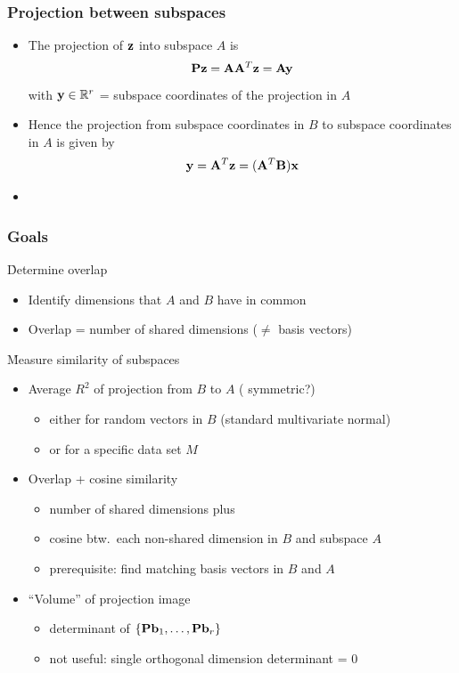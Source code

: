 \documentclass[t]{beamer} %
\begin{document}
\begin{frame}
  \frametitle{Projection between subspaces}

  \begin{itemize}
  \item The projection of $\vz$ into subspace $A$ is
    \[
      \mathbf{P} \vz = \mathbf{A} \mathbf{A}^T \vz = \mathbf{A} \vy
    \]
    with $\vy\in \setR^r$ = subspace coordinates of the projection in $A$
  \item Hence the projection from subspace coordinates in $B$ to subspace coordinates in $A$ is given by
    \[
      \vy = \mathbf{A}^T \vz = (\mathbf{A}^T \mathbf{B}) \vx
    \]
  \item {}
  \end{itemize}
\end{frame}

\begin{frame}
  \frametitle{Goals}

  \h{Determine overlap}
  \begin{itemize}
  \item<2-> Identify dimensions that $A$ and $B$ have in common
  \item<2-> Overlap = number of shared dimensions ($\neq$ basis vectors)
  \end{itemize}

  \h{Measure similarity of subspaces}
  \begin{itemize}
  \item<3-> Average $R^2$ of projection from $B$ to $A$ (\hand{} symmetric?)
    \begin{itemize}
    \item either for random vectors in $B$ (standard multivariate normal)
    \item or for a specific data set $M$
    \end{itemize}
  \item<4-> Overlap + cosine similarity
    \begin{itemize}
    \item number of shared dimensions plus
    \item cosine btw.\ each non-shared dimension in $B$ and subspace $A$
    \item prerequisite: find matching basis vectors in $B$ and $A$
    \end{itemize}
  \item<5-> ``Volume'' of projection image
    \begin{itemize}
    \item determinant of $\set{\mathbf{P}\vb_1, \ldots, \mathbf{P}\vb_r}$
    \item not useful: single orthogonal dimension \so{} determinant = 0
    \end{itemize}
  \end{itemize}
\end{frame}
\end{document}
